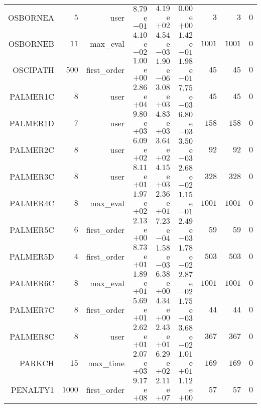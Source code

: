\begin{longtable}{rrrrrrrrr}
OSBORNEA & \(     5\) & user & \( 8.79\)e\(-01\) & \( 4.19\)e\(+02\) & \( 0.00\)e\(+00\) & \(     3\) & \(     3\) & \(     0\) \\
OSBORNEB & \(    11\) & max\_eval & \( 4.10\)e\(-02\) & \( 4.54\)e\(-03\) & \( 1.42\)e\(-01\) & \(  1001\) & \(  1001\) & \(     0\) \\
OSCIPATH & \(   500\) & first\_order & \( 1.00\)e\(+00\) & \( 1.90\)e\(-06\) & \( 1.98\)e\(-01\) & \(    45\) & \(    45\) & \(     0\) \\
PALMER1C & \(     8\) & user & \( 2.86\)e\(+04\) & \( 3.08\)e\(+03\) & \( 7.75\)e\(-03\) & \(    45\) & \(    45\) & \(     0\) \\
PALMER1D & \(     7\) & user & \( 9.80\)e\(+03\) & \( 4.83\)e\(+03\) & \( 6.80\)e\(-03\) & \(   158\) & \(   158\) & \(     0\) \\
PALMER2C & \(     8\) & user & \( 6.09\)e\(+02\) & \( 3.64\)e\(+02\) & \( 3.50\)e\(-03\) & \(    92\) & \(    92\) & \(     0\) \\
PALMER3C & \(     8\) & user & \( 8.11\)e\(+01\) & \( 4.15\)e\(+03\) & \( 2.68\)e\(-02\) & \(   328\) & \(   328\) & \(     0\) \\
PALMER4C & \(     8\) & max\_eval & \( 1.97\)e\(+02\) & \( 2.36\)e\(+01\) & \( 1.15\)e\(-01\) & \(  1001\) & \(  1001\) & \(     0\) \\
PALMER5C & \(     6\) & first\_order & \( 2.13\)e\(+00\) & \( 7.23\)e\(-04\) & \( 2.49\)e\(-03\) & \(    59\) & \(    59\) & \(     0\) \\
PALMER5D & \(     4\) & first\_order & \( 8.73\)e\(+01\) & \( 1.58\)e\(-03\) & \( 1.78\)e\(-02\) & \(   503\) & \(   503\) & \(     0\) \\
PALMER6C & \(     8\) & max\_eval & \( 1.89\)e\(+01\) & \( 6.38\)e\(+00\) & \( 2.87\)e\(-02\) & \(  1001\) & \(  1001\) & \(     0\) \\
PALMER7C & \(     8\) & first\_order & \( 5.69\)e\(+01\) & \( 4.34\)e\(+00\) & \( 1.75\)e\(-03\) & \(    44\) & \(    44\) & \(     0\) \\
PALMER8C & \(     8\) & user & \( 2.62\)e\(+01\) & \( 2.43\)e\(+01\) & \( 3.68\)e\(-02\) & \(   367\) & \(   367\) & \(     0\) \\
PARKCH & \(    15\) & max\_time & \( 2.07\)e\(+03\) & \( 6.29\)e\(+02\) & \( 1.01\)e\(+01\) & \(   169\) & \(   169\) & \(     0\) \\
PENALTY1 & \(  1000\) & first\_order & \( 9.17\)e\(+08\) & \( 2.11\)e\(+07\) & \( 1.12\)e\(+00\) & \(    57\) & \(    57\) & \(     0\) \\

\end{longtable}
